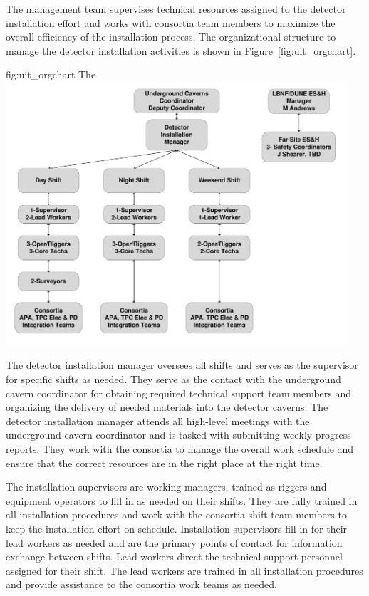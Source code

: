 The management team supervises technical resources assigned to 
the detector installation effort and works with consortia 
team members to maximize the overall efficiency of the installation 
process.  The organizational structure to manage the detector 
installation activities is shown in Figure~\ref{fig:uit_orgchart}.
\begin{dunefigure}{fig:uit_orgchart}
  {The }
  \includegraphics[width=0.95\textwidth]{graphics/org-uit-team}
\end{dunefigure}

The detector installation manager oversees all shifts and serves as
the supervisor for specific shifts as needed.  They serve as the
contact with the underground cavern coordinator for obtaining
required technical support team members and organizing the delivery of
needed materials into the detector caverns.  The detector installation
manager attends all high-level meetings with the underground cavern
coordinator and is tasked with submitting weekly progress reports.
They work with the  consortia to manage the overall work
schedule and ensure that the correct resources are in the right place
at the right time.
    
The installation supervisors are working managers, trained as riggers
and equipment operators to fill in as needed on their shifts.  They
are fully trained in all installation procedures and work with the
consortia shift team members to keep the installation effort on
schedule.  Installation supervisors fill in for their lead workers as
needed and are the primary points of contact for information exchange
between shifts.  Lead workers direct the technical support personnel
assigned for their shift.  The lead workers are trained in all
installation procedures and provide assistance to the consortia work
teams as needed.

